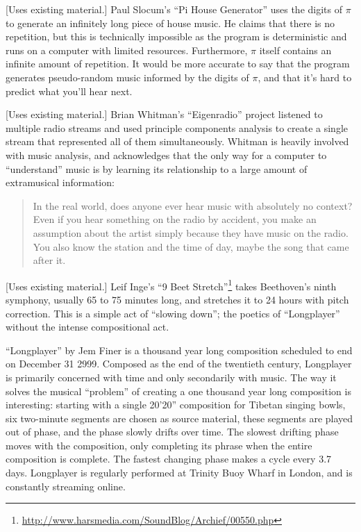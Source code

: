 \documentclass{thesis}
\begin{document}
	[Uses existing material.] Paul Slocum's ``Pi House Generator''\cite{paul_slocum_pi_2007} uses the digits of $\pi$ to generate an infinitely long piece of house music. He claims that there is no repetition, but this is technically impossible as the program is deterministic and runs on a computer with limited resources. Furthermore, $\pi$ itself contains an infinite amount of repetition. It would be more accurate to say that the program generates pseudo-random music informed by the digits of $\pi$, and that it's hard to predict what you'll hear next.

	[Uses existing material.] Brian Whitman's ``Eigenradio''\cite{brian_whitman_eigenradio_2005} project listened to multiple radio streams and used principle components analysis to create a single stream that represented all of them simultaneously. Whitman is heavily involved with music analysis, and acknowledges that the only way for a computer to ``understand'' music is by learning its relationship to a large amount of extramusical information:
	
	\begin{quote}
	In the real world, does anyone ever hear music with absolutely no context? Even if you hear something on the radio by accident, you make an assumption about the artist simply because they have music on the radio. You also know the station and the time of day, maybe the song that came after it.
	\end{quote}
	
	[Uses existing material.] Leif Inge's ``9 Beet Stretch''\footnote{\url{http://www.harsmedia.com/SoundBlog/Archief/00550.php}} takes Beethoven's ninth symphony, usually 65 to 75 minutes long, and stretches it to 24 hours with pitch correction. This is a simple act of ``slowing down''; the poetics of ``Longplayer'' without the intense compositional act.
	
	``Longplayer'' by Jem Finer\cite{jem_finer_longplayer_????} is a thousand year long composition scheduled to end on December 31 2999. Composed as the end of the twentieth century, Longplayer is primarily concerned with time and only secondarily with music. The way it solves the musical ``problem'' of creating a one thousand year long composition is interesting: starting with a single 20'20'' composition for Tibetan singing bowls, six two-minute segments are chosen as source material, these segments are played out of phase, and the phase slowly drifts over time. The slowest drifting phase moves with the composition, only completing its phrase when the entire composition is complete. The fastest changing phase makes a cycle every 3.7 days. Longplayer is regularly performed at Trinity Buoy Wharf in London, and is constantly streaming online.
		
\end{document}
